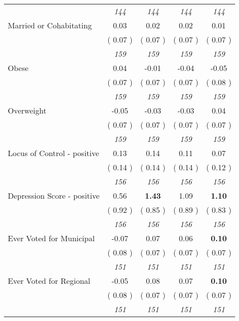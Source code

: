 \begin{tabular}{l c c c c}
& \textit{ 144 } & \textit{ 144 } & \textit{ 144 } & \textit{ 144 } \\
Married or Cohabitating &      0.03 &      0.02 &      0.02 &      0.01 \\
& (     0.07 ) & (     0.07 ) & (     0.07 ) & (     0.07 ) \\
& \textit{ 159 } & \textit{ 159 } & \textit{ 159 } & \textit{ 159 } \\
Obese &      0.04 &     -0.01 &     -0.04 &     -0.05 \\
& (     0.07 ) & (     0.07 ) & (     0.07 ) & (     0.08 ) \\
& \textit{ 159 } & \textit{ 159 } & \textit{ 159 } & \textit{ 159 } \\
Overweight &     -0.05 &     -0.03 &     -0.03 &      0.04 \\
& (     0.07 ) & (     0.07 ) & (     0.07 ) & (     0.07 ) \\
& \textit{ 159 } & \textit{ 159 } & \textit{ 159 } & \textit{ 159 } \\
Locus of Control - positive &      0.13 &      0.14 &      0.11 &      0.07 \\
& (     0.14 ) & (     0.14 ) & (     0.14 ) & (     0.12 ) \\
& \textit{ 156 } & \textit{ 156 } & \textit{ 156 } & \textit{ 156 } \\
Depression Score - positive &      0.56 & \textbf{      1.43 } &      1.09 & \textbf{     1.10} \\
& (     0.92 ) & (     0.85 ) & (     0.89 ) & (     0.83 ) \\
& \textit{ 156 } & \textit{ 156 } & \textit{ 156 } & \textit{ 156 } \\
Ever Voted for Municipal &     -0.07 &      0.07 &      0.06 & \textbf{     0.10} \\
& (     0.08 ) & (     0.07 ) & (     0.07 ) & (     0.07 ) \\
& \textit{ 151 } & \textit{ 151 } & \textit{ 151 } & \textit{ 151 } \\
Ever Voted for Regional &     -0.05 &      0.08 &      0.07 & \textbf{     0.10} \\
& (     0.08 ) & (     0.07 ) & (     0.07 ) & (     0.07 ) \\
& \textit{ 151 } & \textit{ 151 } & \textit{ 151 } & \textit{ 151 } \\
\bottomrule
\end{tabular}
